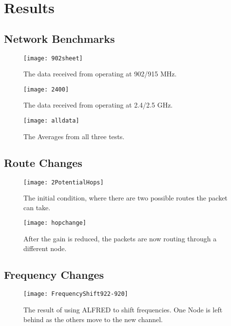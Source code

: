 \section{Results}

\subsection{Network Benchmarks}

\begin{figure*}
	\centering
	\texttt{[image: 902sheet]}
	\caption{The data received from operating at 902/915 MHz.}
	\label{fig:spreadhsheet2}
\end{figure*}

\begin{figure*}
	\centering
	\texttt{[image: 2400]}
	\caption{The data received from operating at 2.4/2.5 GHz.}
	\label{fig:2400}
\end{figure*}

\begin{figure}
	\centering
	\texttt{[image: alldata]}
	\caption{The Averages from all three tests.}
	\label{fig:alldata}
\end{figure}


\subsection{Route Changes}

\begin{figure*}
	\centering
	\texttt{[image: 2PotentialHops]}
	\caption{The initial condition, where there are two possible routes the packet can take.}
	\label{fig:2Hops}
\end{figure*}

\begin{figure*}
	\centering
	\texttt{[image: hopchange]}
	\caption{After the gain is reduced, the packets are now routing through a different node.}
	\label{fig:NewHop}
\end{figure*}

\subsection{Frequency Changes}

\begin{figure}
	\centering
	\texttt{[image: FrequencyShift922-920]}
	\caption{The result of using ALFRED to shift frequencies. One Node is left behind as the others move to the new channel.}
	\label{fig:freqshift}
\end{figure}


